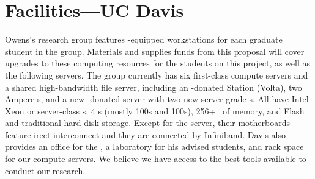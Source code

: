 \section*{Facilities---UC Davis}

 Owens's research group features -equipped workstations for each graduate student in the group. Materials and supplies funds from this proposal will cover upgrades to these computing resources for the students on this project, as well as the following servers. The group currently has six first-class  compute servers and a shared high-bandwidth file server, including an -donated  Station (Volta), two  Ampere s, and a new -donated server with two new  server-grade s. All have Intel Xeon or  server-class s, 4  s (mostly 100s and 100s), 256+~ of memory, and Flash and traditional hard disk storage. Except for the  server, their motherboards feature irect interconnect and they are connected by Infiniband.  Davis also provides an office for the , a laboratory for his advised students, and rack space for our compute servers. We believe we have access to the best tools available to conduct our research.

